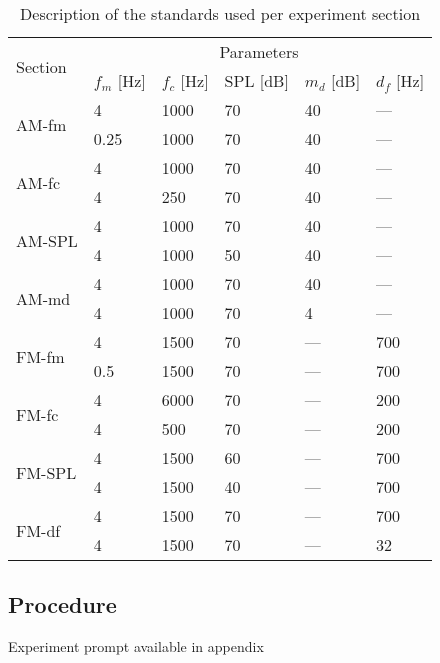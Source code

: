 \documentclass[../main.tex]{subfiles}
\begin{document}
\begin{table}[!ht]
  \centering
  \begin{tabular}{l l l l l l}
    \toprule
    \multirow{2}{*}{Section} & \multicolumn{5}{c}{Parameters} \\
    \cmidrule{2-6}
    & $f_m$ [Hz] & $f_c$ [Hz] & SPL [dB] & $m_d$ [dB] & $d_f$ [Hz] \\
    \midrule
    \multirow{2}{*}{AM-fm}  & 4 & 1000 & 70 & 40 & --- \\
                            & 0.25 & 1000 & 70 & 40 & --- \\
    \midrule
    \multirow{2}{*}{AM-fc}  & 4 & 1000 & 70 & 40 & --- \\
                            & 4 & 250 & 70 & 40 & --- \\
    \midrule
    \multirow{2}{*}{AM-SPL} & 4 & 1000 & 70 & 40 & --- \\
                            & 4 & 1000 & 50 & 40 & --- \\
    \midrule
    \multirow{2}{*}{AM-md}  & 4 & 1000 & 70 & 40 & --- \\
                            & 4 & 1000 & 70 & 4 & --- \\
    \midrule
    \multirow{2}{*}{FM-fm}  & 4 & 1500 & 70 & --- & 700 \\
                            & 0.5 & 1500 & 70 & --- & 700 \\
    \midrule
    \multirow{2}{*}{FM-fc}  & 4 & 6000 & 70 & --- & 200 \\
                            & 4 & 500 & 70 & --- & 200 \\
    \midrule
    \multirow{2}{*}{FM-SPL} & 4 & 1500 & 60 & --- & 700 \\
                            & 4 & 1500 & 40 & --- & 700 \\
    \midrule
    \multirow{2}{*}{FM-df}  & 4 & 1500 & 70 & --- & 700 \\
                            & 4 & 1500 & 70 & --- & 32 \\
    \bottomrule
  \end{tabular}
  \caption{Description of the standards used per experiment section}
\label{tab:standards}
\end{table}

\subsection{Procedure}

Experiment prompt available in appendix
\end{document}
